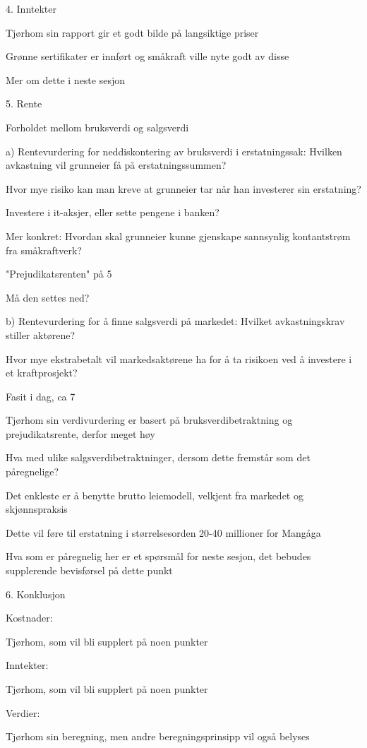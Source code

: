 \documentclass[12pt,a4paper]{article} %
\begin{document}
4.	Inntekter

	Tjørhom sin rapport gir et godt bilde på langsiktige priser

	Grønne sertifikater er innført og småkraft ville nyte godt av disse

	Mer om dette i neste sesjon

5.	Rente

	Forholdet mellom bruksverdi og salgsverdi

a)	Rentevurdering for neddiskontering av bruksverdi i erstatningssak: Hvilken avkastning vil grunneier få på erstatningssummen?
	
	Hvor mye risiko kan man kreve at grunneier tar når han investerer sin erstatning?
	
	Investere i it-aksjer, eller sette pengene i banken?

	Mer konkret: Hvordan skal grunneier kunne gjenskape sannsynlig kontantstrøm fra småkraftverk?

	"Prejudikatsrenten" på 5 %

	Må den settes ned?

b)	Rentevurdering for å finne salgsverdi på markedet: Hvilket avkastningskrav stiller aktørene?

	Hvor mye ekstrabetalt vil markedsaktørene ha for å ta risikoen ved å investere i et kraftprosjekt?

	Fasit i dag, ca 7 %

	Tjørhom sin verdivurdering er basert på bruksverdibetraktning og prejudikatsrente, derfor meget høy

	Hva med ulike salgsverdibetraktninger, dersom dette fremstår som det påregnelige?

	Det enkleste er å benytte brutto leiemodell, velkjent fra markedet og skjønnspraksis

	Dette vil føre til erstatning i størrelsesorden 20-40 millioner for Mangåga

	Hva som er påregnelig her er et spørsmål for neste sesjon, det bebudes supplerende bevisførsel på dette punkt
	
6.	Konklusjon

	Kostnader:

	Tjørhom, som vil bli supplert på noen punkter

	Inntekter:

	Tjørhom, som vil bli supplert på noen punkter

	Verdier:

	Tjørhom sin beregning, men andre beregningsprinsipp vil også belyses
\end{document}
